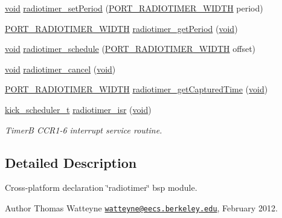 \begin{DoxyCompactItemize}
\item 
\hyperlink{usb__devapi_8h_afabf60e7f57651d6d595a02c75f07cd0}{void} \hyperlink{group__radiotimer_gaa976e43c1c475e9ff23b26ed06fa6918}{radiotimer\+\_\+set\+Period} (\hyperlink{z1_2board__info_8h_ac16e02aadd749b2d27638bed1a805a59}{P\+O\+R\+T\+\_\+\+R\+A\+D\+I\+O\+T\+I\+M\+E\+R\+\_\+\+W\+I\+D\+TH} period)
\item 
\hyperlink{z1_2board__info_8h_ac16e02aadd749b2d27638bed1a805a59}{P\+O\+R\+T\+\_\+\+R\+A\+D\+I\+O\+T\+I\+M\+E\+R\+\_\+\+W\+I\+D\+TH} \hyperlink{group__radiotimer_ga6e96a37a1a07cb7ec7639bfb44759437}{radiotimer\+\_\+get\+Period} (\hyperlink{usb__devapi_8h_afabf60e7f57651d6d595a02c75f07cd0}{void})
\item 
\hyperlink{usb__devapi_8h_afabf60e7f57651d6d595a02c75f07cd0}{void} \hyperlink{group__radiotimer_ga137a48c413a18f689b328b2be259704c}{radiotimer\+\_\+schedule} (\hyperlink{z1_2board__info_8h_ac16e02aadd749b2d27638bed1a805a59}{P\+O\+R\+T\+\_\+\+R\+A\+D\+I\+O\+T\+I\+M\+E\+R\+\_\+\+W\+I\+D\+TH} offset)
\item 
\hyperlink{usb__devapi_8h_afabf60e7f57651d6d595a02c75f07cd0}{void} \hyperlink{group__radiotimer_ga87b29bd5be3a34ea714da11d244e43f2}{radiotimer\+\_\+cancel} (\hyperlink{usb__devapi_8h_afabf60e7f57651d6d595a02c75f07cd0}{void})
\item 
\hyperlink{z1_2board__info_8h_ac16e02aadd749b2d27638bed1a805a59}{P\+O\+R\+T\+\_\+\+R\+A\+D\+I\+O\+T\+I\+M\+E\+R\+\_\+\+W\+I\+D\+TH} \hyperlink{group__radiotimer_ga3f869c34f63741cf1aa6e43321662f78}{radiotimer\+\_\+get\+Captured\+Time} (\hyperlink{usb__devapi_8h_afabf60e7f57651d6d595a02c75f07cd0}{void})
\item 
\hyperlink{group__board_gac9ebdcc0a4f3c8422f5f4f0fbbe0ded0}{kick\+\_\+scheduler\+\_\+t} \hyperlink{group__radiotimer_ga45ba49be562da796046e90c03fdb1433}{radiotimer\+\_\+isr} (\hyperlink{usb__devapi_8h_afabf60e7f57651d6d595a02c75f07cd0}{void})
\begin{DoxyCompactList}\small\item\em TimerB C\+C\+R1-\/6 interrupt service routine. \end{DoxyCompactList}\end{DoxyCompactItemize}


\subsection{Detailed Description}
Cross-\/platform declaration \char`\"{}radiotimer\char`\"{} bsp module. 

\begin{DoxyAuthor}{Author}
Thomas Watteyne \href{mailto:watteyne@eecs.berkeley.edu}{\tt watteyne@eecs.\+berkeley.\+edu}, February 2012. 
\end{DoxyAuthor}



